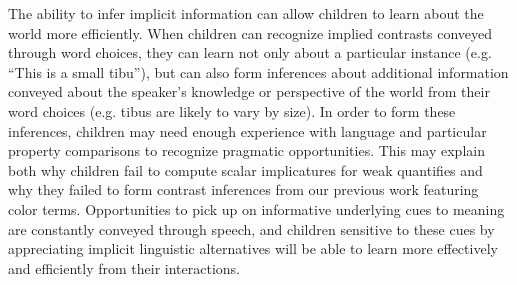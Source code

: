 \documentclass[10pt,letterpaper]{article}
\begin{document}
The ability to infer implicit information can allow children to learn about the world more efficiently.  When children can recognize implied contrasts conveyed through word choices, they can learn not only about a particular instance (e.g. ``This is a small tibu''), but can also form inferences about additional information conveyed about the speaker's knowledge or perspective of the world from their word choices (e.g. tibus are likely to vary by size).  In order to form these inferences, children may need enough experience with language and particular property comparisons to recognize pragmatic opportunities.  This may explain both why children fail to compute scalar implicatures for weak quantifies and why they failed to form contrast inferences from our previous work featuring color terms.  Opportunities to pick up on informative underlying cues to meaning are constantly conveyed through speech, and children sensitive to these cues by appreciating implicit linguistic alternatives will be able to learn more effectively and efficiently from their interactions. 


\end{document}
